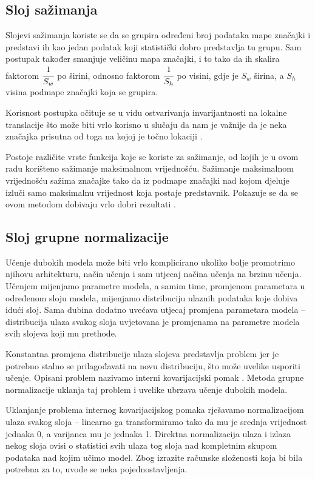 \documentclass[times, utf8, diplomski, numeric]{fer}
\begin{document}
\subsection{Sloj sažimanja}
Slojevi sažimanja koriste se da se grupira određeni broj podataka mape značajki i predstavi ih kao jedan podatak koji statistički dobro predstavlja tu grupu.
Sam postupak također smanjuje veličinu mapa značajki, i to tako da ih skalira faktorom $\cfrac{1}{S_w}$ po širini, odnosno faktorom $\cfrac{1}{S_h}$ po visini, gdje je $S_w$ širina, a $S_h$ visina podmape značajki koja se grupira.

Korisnost postupka očituje se u vidu ostvarivanja invarijantnosti na lokalne translacije što može biti vrlo korisno u slučaju da nam je važnije da je neka značajka prisutna od toga na kojoj je točno lokaciji \citep{seminar:rela}.

Postoje različite vrste funkcija koje se koriste za sažimanje, od kojih je u ovom radu korišteno sažimanje maksimalnom vrijednošću.
Sažimanje maksimalnom vrijednošću  sažima značajke tako da iz podmape značajki nad kojom djeluje izluči samo maksimalnu vrijednost koja postaje predstavnik.
Pokazuje se da se ovom metodom dobivaju vrlo dobri rezultati \citep{article:maxpooling_article}.

\subsection{Sloj grupne normalizacije }
Učenje dubokih modela može biti vrlo komplicirano ukoliko bolje promotrimo njihovu arhitekturu, način učenja i sam utjecaj načina učenja na brzinu učenja.
Učenjem mijenjamo parametre modela, a samim time, promjenom parametara u određenom sloju modela, mijenjamo distribuciju ulaznih podataka koje dobiva idući sloj.
Sama dubina dodatno uvećava utjecaj promjena parametara modela -- distribucija ulaza svakog sloja uvjetovana je promjenama na parametre modela svih slojeva koji mu prethode.

Konstantna promjena distribucije ulaza slojeva predstavlja problem jer je potrebno stalno se prilagođavati na novu distribuciju, što može uvelike usporiti učenje.
Opisani problem nazivamo interni kovarijacijski pomak . 
Metoda grupne normalizacije  uklanja taj problem i uvelike ubrzava učenje dubokih modela.

Uklanjanje problema internog kovarijacijskog pomaka rješavamo normalizacijom ulaza svakog sloja -- linearno ga transformiramo tako da mu je srednja vrijednost jednaka 0, a varijanca mu je jednaka 1.
Direktna normalizacija ulaza i izlaza nekog sloja ovisi o statistici svih ulaza tog sloja nad kompletnim skupom podataka nad kojim učimo model.
Zbog izrazite računske složenosti koja bi bila potrebna za to, uvode se neka pojednostavljenja.
\end{document}
